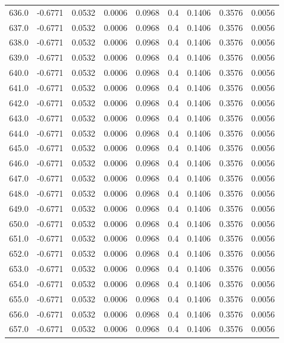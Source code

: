 \begin{longtable}{lrrrrrrrr}
636.0 & -0.6771 & 0.0532 & 0.0006 & 0.0968 & 0.4 & 0.1406 & 0.3576 & 0.0056 \\
637.0 & -0.6771 & 0.0532 & 0.0006 & 0.0968 & 0.4 & 0.1406 & 0.3576 & 0.0056 \\
638.0 & -0.6771 & 0.0532 & 0.0006 & 0.0968 & 0.4 & 0.1406 & 0.3576 & 0.0056 \\
639.0 & -0.6771 & 0.0532 & 0.0006 & 0.0968 & 0.4 & 0.1406 & 0.3576 & 0.0056 \\
640.0 & -0.6771 & 0.0532 & 0.0006 & 0.0968 & 0.4 & 0.1406 & 0.3576 & 0.0056 \\
641.0 & -0.6771 & 0.0532 & 0.0006 & 0.0968 & 0.4 & 0.1406 & 0.3576 & 0.0056 \\
642.0 & -0.6771 & 0.0532 & 0.0006 & 0.0968 & 0.4 & 0.1406 & 0.3576 & 0.0056 \\
643.0 & -0.6771 & 0.0532 & 0.0006 & 0.0968 & 0.4 & 0.1406 & 0.3576 & 0.0056 \\
644.0 & -0.6771 & 0.0532 & 0.0006 & 0.0968 & 0.4 & 0.1406 & 0.3576 & 0.0056 \\
645.0 & -0.6771 & 0.0532 & 0.0006 & 0.0968 & 0.4 & 0.1406 & 0.3576 & 0.0056 \\
646.0 & -0.6771 & 0.0532 & 0.0006 & 0.0968 & 0.4 & 0.1406 & 0.3576 & 0.0056 \\
647.0 & -0.6771 & 0.0532 & 0.0006 & 0.0968 & 0.4 & 0.1406 & 0.3576 & 0.0056 \\
648.0 & -0.6771 & 0.0532 & 0.0006 & 0.0968 & 0.4 & 0.1406 & 0.3576 & 0.0056 \\
649.0 & -0.6771 & 0.0532 & 0.0006 & 0.0968 & 0.4 & 0.1406 & 0.3576 & 0.0056 \\
650.0 & -0.6771 & 0.0532 & 0.0006 & 0.0968 & 0.4 & 0.1406 & 0.3576 & 0.0056 \\
651.0 & -0.6771 & 0.0532 & 0.0006 & 0.0968 & 0.4 & 0.1406 & 0.3576 & 0.0056 \\
652.0 & -0.6771 & 0.0532 & 0.0006 & 0.0968 & 0.4 & 0.1406 & 0.3576 & 0.0056 \\
653.0 & -0.6771 & 0.0532 & 0.0006 & 0.0968 & 0.4 & 0.1406 & 0.3576 & 0.0056 \\
654.0 & -0.6771 & 0.0532 & 0.0006 & 0.0968 & 0.4 & 0.1406 & 0.3576 & 0.0056 \\
655.0 & -0.6771 & 0.0532 & 0.0006 & 0.0968 & 0.4 & 0.1406 & 0.3576 & 0.0056 \\
656.0 & -0.6771 & 0.0532 & 0.0006 & 0.0968 & 0.4 & 0.1406 & 0.3576 & 0.0056 \\
657.0 & -0.6771 & 0.0532 & 0.0006 & 0.0968 & 0.4 & 0.1406 & 0.3576 & 0.0056 \\

\end{longtable}
